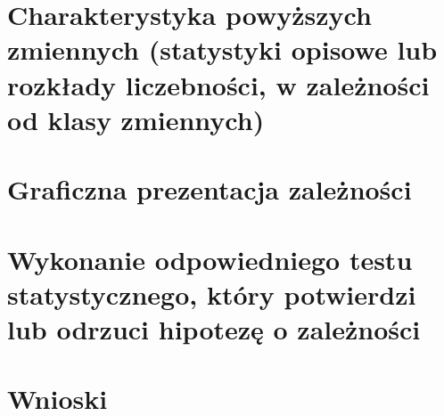 	\section{Charakterystyka powyższych zmiennych (statystyki opisowe lub rozkłady liczebności, w zależności od klasy zmiennych)}
	
	\section{Graficzna prezentacja zależności}
	
	\section{Wykonanie odpowiedniego testu statystycznego, który potwierdzi lub odrzuci hipotezę o zależności}

	\section{Wnioski}


	
